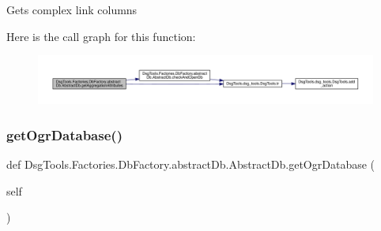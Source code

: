 \begin{DoxyVerb}Gets complex link columns
\end{DoxyVerb}
 Here is the call graph for this function\+:
\nopagebreak
\begin{figure}[H]
\begin{center}
\leavevmode
\includegraphics[width=350pt]{class_dsg_tools_1_1_factories_1_1_db_factory_1_1abstract_db_1_1_abstract_db_a3def3982594ab83c828bf0b6dce42ce6_cgraph}
\end{center}
\end{figure}
\mbox{\label{class_dsg_tools_1_1_factories_1_1_db_factory_1_1abstract_db_1_1_abstract_db_a7cd3ddea6686c59a6369b16b8f40794a}} 
\subsubsection{\texorpdfstring{get\+Ogr\+Database()}{getOgrDatabase()}}
{\footnotesize\ttfamily def Dsg\+Tools.\+Factories.\+Db\+Factory.\+abstract\+Db.\+Abstract\+Db.\+get\+Ogr\+Database (\begin{DoxyParamCaption}\item[{}]{self }\end{DoxyParamCaption})}

